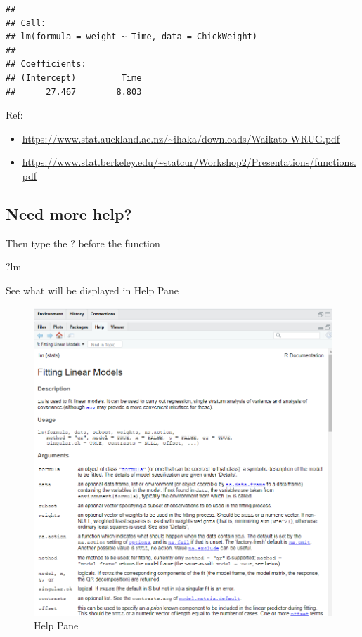 \documentclass[
]{book}
\makeatletter
\newenvironment{Shaded}{\begin{snugshade}}{\end{snugshade}}
\newcommand{\NormalTok}[1]{#1}
\providecommand{\tightlist}{%
  \setlength{\itemsep}{0pt}\setlength{\parskip}{0pt}}
\newenvironment{kframe}{%
\medskip{}
\setlength{\fboxsep}{.8em}
 \def\at@end@of@kframe{}%
 \ifinner\ifhmode%
  \def\at@end@of@kframe{\end{minipage}}%
  \begin{minipage}{\columnwidth}%
 \fi\fi%
 \def\FrameCommand##1{\hskip\@totalleftmargin \hskip-\fboxsep
 \colorbox{shadecolor}{##1}\hskip-\fboxsep
     \hskip-\linewidth \hskip-\@totalleftmargin \hskip\columnwidth}%
 \MakeFramed {\advance\hsize-\width
   \@totalleftmargin\z@ \linewidth\hsize
   \@setminipage}}%
 {\par\unskip\endMakeFramed%
 \at@end@of@kframe}
\renewenvironment{Shaded}{\begin{kframe}}{\end{kframe}}
\makeatother
\begin{document}
\begin{verbatim}
## 
## Call:
## lm(formula = weight ~ Time, data = ChickWeight)
## 
## Coefficients:
## (Intercept)         Time  
##      27.467        8.803
\end{verbatim}

Ref:

\begin{itemize}
\tightlist
\item
  \url{https://www.stat.auckland.ac.nz/~ihaka/downloads/Waikato-WRUG.pdf}
\item
  \url{https://www.stat.berkeley.edu/~statcur/Workshop2/Presentations/functions.pdf}
\end{itemize}

\hypertarget{need-more-help}{%
\subsection{Need more help?}\label{need-more-help}}

Then type the ? before the function

\begin{Shaded}
\begin{Highlighting}[]
\NormalTok{?lm}
\end{Highlighting}
\end{Shaded}

See what will be displayed in Help Pane

\begin{figure}
\centering
\includegraphics{lm.PNG}
\caption{Help Pane}
\end{figure}
\end{document}
